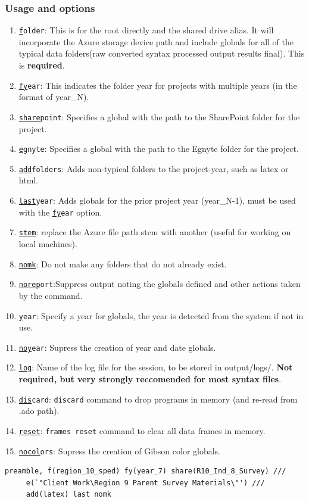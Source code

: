 {\subsubsection{Usage and options}
\begin{enumerate}
\item \texttt{\underline{f}older}: This is for the root directly and the shared drive alias. It will incorporate the Azure storage device path and include globals for all of the typical data folders(raw converted syntax processed output results final). This is \textbf{required}.
\item \texttt{\underline{fy}ear}: This indicates the folder year for projects with multiple years (in the format of year\_N).
\item \texttt{\underline{share}point}: Specifies a global with the path to the SharePoint folder for the project.
\item \texttt{\underline{e}gnyte}: Specifies a global with the path to the Egnyte folder for the project.
\item \texttt{\underline{add}folders}: Adds non-typical folders to the project-year, such as latex or html.
\item \texttt{\underline{last}year}: Adds globals for the prior project year (year\_N-1), must be used with the \texttt{\underline{fy}ear} option.
\item \texttt{\underline{stem}}: replace the Azure file path stem with another (useful for working on local machines).
\item \texttt{\underline{nomk}}: Do not make any folders that do not already exist.
\item \texttt{\underline{norep}ort}:Suppress output noting the globals defined and other actions taken by the command.
\item \texttt{\underline{y}ear}: Specify a year for globals, the year is detected from the system if not in use.
\item \texttt{\underline{noy}ear}: Supress the creation of year and date globals.
\item \texttt{\underline{log}}: Name of the log file for the session, to be stored in output/logs/. \textbf{Not required, but very strongly reccomended for most syntax files}.
\item \texttt{\underline{dis}card}: \texttt{discard} command to drop programs in memory (and re-read from .ado path).
\item \texttt{\underline{reset}}: \texttt{frames reset} command to clear all data frames in memory.
\item \texttt{\underline{nocol}ors}: Supress the creation of Gibson color globals.
\end{enumerate}
\begin{lstlisting}
preamble, f(region_10_sped) fy(year_7) share(R10_Ind_8_Survey) ///
	 e(`"Client Work\Region 9 Parent Survey Materials\"') ///
	 add(latex) last nomk
\end{lstlisting}

}
